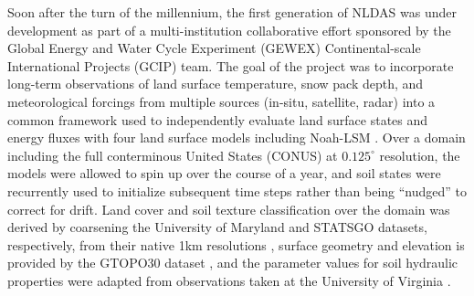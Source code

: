 Soon after the turn of the millennium, the first generation of NLDAS was under development as part of a multi-institution collaborative effort sponsored by the Global Energy and Water Cycle Experiment (GEWEX) Continental-scale International Projects (GCIP) team. The goal of the project was to incorporate long-term observations of land surface temperature, snow pack depth, and meteorological forcings from multiple sources (in-situ, satellite, radar) into a common framework used to independently evaluate land surface states and energy fluxes with four land surface models including Noah-LSM \parencite{mitchell_multi-institution_2004}. Over a domain including the full conterminous United States (CONUS) at $0.125^\circ$ resolution, the models were allowed to spin up over the course of a year, and soil states were recurrently used to initialize subsequent time steps rather than being ``nudged'' to correct for drift. Land cover and soil texture classification over the domain was derived by coarsening the University of Maryland and STATSGO datasets, respectively, from their native 1km resolutions \parencite{hansen_global_2000}, surface geometry and elevation is provided by the GTOPO30 dataset \parencite{earth_resources_observation_and_science_centeru_s_geological_surveyu_s_department_of_the_interior_usgs_1997}, and the parameter values for soil hydraulic properties were adapted from observations taken at the University of Virginia \parencite{cosby_statistical_1984}.

